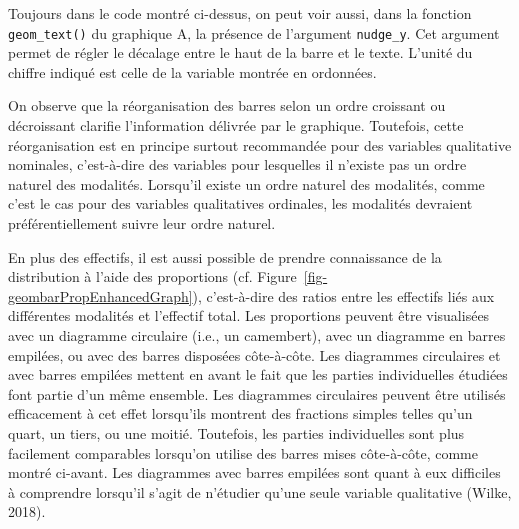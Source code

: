 \documentclass[
  letterpaper,
]{book}
\begin{document}
Toujours dans le code montré ci-dessus, on peut voir aussi, dans la
fonction \texttt{geom\_text()} du graphique A, la présence de l'argument
\texttt{nudge\_y}. Cet argument permet de régler le décalage entre le
haut de la barre et le texte. L'unité du chiffre indiqué est celle de la
variable montrée en ordonnées.

On observe que la réorganisation des barres selon un ordre croissant ou
décroissant clarifie l'information délivrée par le graphique. Toutefois,
cette réorganisation est en principe surtout recommandée pour des
variables qualitative nominales, c'est-à-dire des variables pour
lesquelles il n'existe pas un ordre naturel des modalités. Lorsqu'il
existe un ordre naturel des modalités, comme c'est le cas pour des
variables qualitatives ordinales, les modalités devraient
préférentiellement suivre leur ordre naturel.

En plus des effectifs, il est aussi possible de prendre connaissance de
la distribution à l'aide des proportions (cf.
Figure~\ref{fig-geombarPropEnhancedGraph}), c'est-à-dire des ratios
entre les effectifs liés aux différentes modalités et l'effectif total.
Les proportions peuvent être visualisées avec un diagramme circulaire
(i.e., un camembert), avec un diagramme en barres empilées, ou avec des
barres disposées côte-à-côte. Les diagrammes circulaires et avec barres
empilées mettent en avant le fait que les parties individuelles étudiées
font partie d'un même ensemble. Les diagrammes circulaires peuvent être
utilisés efficacement à cet effet lorsqu'ils montrent des fractions
simples telles qu'un quart, un tiers, ou une moitié. Toutefois, les
parties individuelles sont plus facilement comparables lorsqu'on utilise
des barres mises côte-à-côte, comme montré ci-avant. Les diagrammes avec
barres empilées sont quant à eux difficiles à comprendre lorsqu'il
s'agit de n'étudier qu'une seule variable qualitative (Wilke, 2018).
\end{document}
